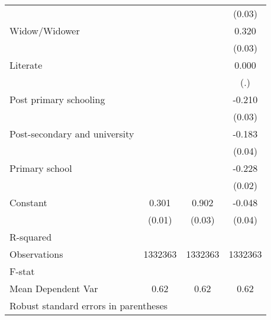 {\begin{tabular}{l*{3}{c}}
                    &                     &                     &      (0.03)         \\
Widow/Widower       &                     &                     &       0.320\sym{***}\\
                    &                     &                     &      (0.03)         \\
Literate            &                     &                     &       0.000         \\
                    &                     &                     &         (.)         \\
Post primary schooling&                     &                     &      -0.210\sym{***}\\
                    &                     &                     &      (0.03)         \\
Post-secondary and university&                     &                     &      -0.183\sym{***}\\
                    &                     &                     &      (0.04)         \\
Primary school      &                     &                     &      -0.228\sym{***}\\
                    &                     &                     &      (0.02)         \\
Constant            &       0.301\sym{***}&       0.902\sym{***}&      -0.048         \\
                    &      (0.01)         &      (0.03)         &      (0.04)         \\
\hline
R-squared           &                     &                     &                     \\
Observations        &     1332363         &     1332363         &     1332363         \\
F-stat              &                     &                     &                     \\
Mean Dependent Var  &        0.62         &        0.62         &        0.62         \\
\hline\hline
\multicolumn{4}{l}{\footnotesize Robust standard errors in parentheses}\\
\end{tabular}
}
